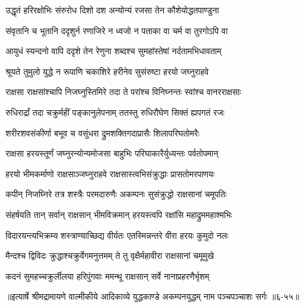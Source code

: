 \twolineshloka
{उद्धृतं हरिरक्षोभिः संरुरोध दिशो दश}
{अन्योन्यं रजसा तेन कौशेयोद्धतपाण्डुना} %

\twolineshloka
{संवृतानि च भूतानि ददृशुर्न रणाजिरे}
{न ध्वजो न पताका वा चर्म वा तुरगोऽपि वा} %

\twolineshloka
{आयुधं स्यन्दनो वापि ददृशे तेन रेणुना}
{शब्दश्च सुमहांस्तेषां नर्दतामभिधावताम्} %

\twolineshloka
{श्रूयते तुमुलो युद्धे न रूपाणि चकाशिरे}
{हरीनेव सुसंरुष्टा हरयो जघ्नुराहवे} %

\twolineshloka
{राक्षसा राक्षसांश्चापि निजघ्नुस्तिमिरे तदा}
{ते परांश्च विनिघ्नन्तः स्वांश्च वानरराक्षसाः} %

\twolineshloka
{रुधिरार्द्रां तदा चक्रुर्महीं पङ्कानुलेपनाम्}
{ततस्तु रुधिरौघेण सिक्तं ह्यपगतं रजः} %

\twolineshloka
{शरीरशवसंकीर्णा बभूव च वसुंधरा}
{द्रुमशक्तिगदाप्रासैः शिलापरिघतोमरैः} %

\twolineshloka
{राक्षसा हरयस्तूर्णं जघ्नुरन्योन्यमोजसा}
{बाहुभिः परिघाकारैर्युध्यन्तः पर्वतोपमान्} %

\twolineshloka
{हरयो भीमकर्माणो राक्षसाञ्जघ्नुराहवे}
{राक्षसास्त्वभिसंक्रुद्धाः प्रासतोमरपाणयः} %

\twolineshloka
{कपीन् निजघ्निरे तत्र शस्त्रैः परमदारुणैः}
{अकम्पनः सुसंक्रुद्धो राक्षसानां चमूपतिः} %

\twolineshloka
{संहर्षयति तान् सर्वान् राक्षसान् भीमविक्रमान्}
{हरयस्त्वपि रक्षांसि महाद्रुममहाश्मभिः} %

\twolineshloka
{विदारयन्त्यभिक्रम्य शस्त्राण्याच्छिद्य वीर्यतः}
{एतस्मिन्नन्तरे वीरा हरयः कुमुदो नलः} %

\twolineshloka
{मैन्दश्च द्विविदः क्रुद्धाश्चक्रुर्वेगमनुत्तमम्}
{ते तु वृक्षैर्महावीरा राक्षसानां चमूमुखे} %

\twolineshloka
{कदनं सुमहच्चक्रुर्लीलया हरिपुंगवाः}
{ममन्थू राक्षसान् सर्वे नानाप्रहरणैर्भृशम्} %


॥इत्यार्षे श्रीमद्रामायणे वाल्मीकीये आदिकाव्ये युद्धकाण्डे अकम्पनयुद्धम् नाम पञ्चपञ्चाशः सर्गः ॥६-५५॥
